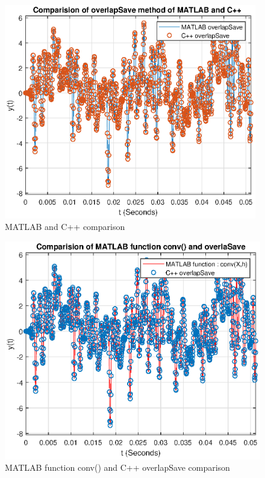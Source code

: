 \begin{figure}[h]
	\centering
	\includegraphics[width=11cm]{./algorithms/overlap_save/figures/randomNoise_matlab_and_C++.eps}
	\caption{MATLAB and C++ comparison}\label{randomNoise_matlab_and_C++}
\end{figure}

\begin{figure}[h]
	\centering
	\includegraphics[width=12cm]{./algorithms/overlap_save/figures/randomNoise_conv_and_C++.eps}
	\caption{MATLAB function conv() and C++ overlapSave comparison}\label{randomNoise_conv_and_C++}
\end{figure}

